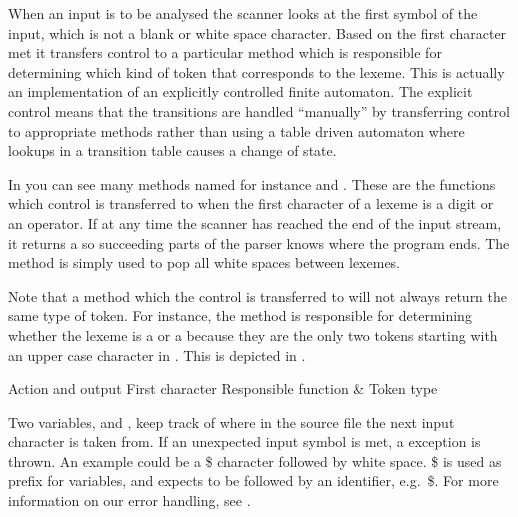 When an input is to be analysed the scanner looks at the first symbol
of the input, which is not a blank or white space character. Based on
the first character met it transfers control to a particular method which is
responsible for determining which kind of token that corresponds to the lexeme.
This is actually an implementation of an explicitly controlled finite
automaton\cite{explicitcontrolledfinitautomaton}. The explicit control means
that the transitions are handled ``manually'' by transferring control to
appropriate methods rather than using a table driven automaton where lookups in
a transition table causes a change of state.

In  you can see many methods named 
 for instance 
and . These are the functions which control is 
transferred to when the first character of a lexeme is a digit or an operator. 
If at any time the scanner has reached the end of
the input stream, it returns a  so succeeding parts of the
parser knows where the program ends. 
The method  is simply used to pop all white spaces between lexemes.

Note that a method which the control is transferred to will not always return the same type of token. 
For instance, the method  is responsible
for determining whether the lexeme is a  or a
 because they are the only two tokens starting
with an upper case character in \productname{}. This is depicted in
. 

                         {Action and output					            }
       {First character	}{Responsible function	& Token type				    }{
}

Two variables,   and 
, keep track of where in the source file the next input
character is taken from. If an unexpected input symbol is met, 
a  exception is thrown. An
example could be a \$ character followed by white space. \$ is used as
prefix for variables, and expects to be followed by an identifier, e.g.\
\$. For more information on our error handling, see 
\secref{sec:errorhandling}.
 
